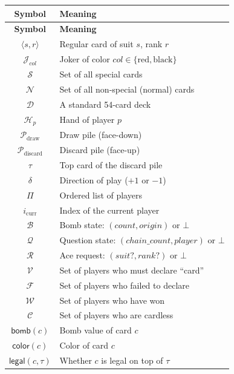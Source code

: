 \documentclass[11pt,a4paper,twoside]{article}
\theoremstyle{definition}
\theoremstyle{remark}
\newcommand{\Card}[2]{\ensuremath{\langle #1, #2 \rangle}}
\newcommand{\Joker}[1]{\ensuremath{\mathcal{J}_{#1}}}
\newcommand{\Deck}{\ensuremath{\mathcal{D}}}
\newcommand{\Hand}{\ensuremath{\mathcal{H}}}
\newcommand{\Pile}{\ensuremath{\mathcal{P}}}
\newcommand{\Top}{\ensuremath{\tau}}
\newcommand{\Dir}{\ensuremath{\delta}}
\newcommand{\Players}{\ensuremath{\Pi}}
\newcommand{\Winner}{\ensuremath{\mathcal{W}}}
\newcommand{\Cardless}{\ensuremath{\mathcal{C}}}
\newcommand{\Bomb}{\ensuremath{\mathcal{B}}}
\newcommand{\Quest}{\ensuremath{\mathcal{Q}}}
\newcommand{\OnVerge}{\ensuremath{\mathcal{V}}}
\newcommand{\Failed}{\ensuremath{\mathcal{F}}}
\newcommand{\CardReq}{\ensuremath{\mathcal{R}}}
\newcommand{\Special}{\ensuremath{\mathcal{S}}}
\newcommand{\Normal}{\ensuremath{\mathcal{N}}}
\newcommand{\func}[1]{\ensuremath{\mathsf{#1}}}
\begin{document}
\begin{longtable}{c|l}
\toprule
\textbf{Symbol} & \textbf{Meaning} \\
\midrule
\endfirsthead
\midrule
\textbf{Symbol} & \textbf{Meaning} \\
\midrule
\endhead
$\Card{s}{r}$     & Regular card of suit $s$, rank $r$ \\
$\Joker{col}$     & Joker of color $col \in \{\text{red}, \text{black}\}$ \\
$\Special$        & Set of all special cards \\
$\Normal$         & Set of all non-special (normal) cards \\
$\Deck$           & A standard 54-card deck \\
$\Hand_p$         & Hand of player $p$ \\
$\Pile_{\text{draw}}$    & Draw pile (face-down) \\
$\Pile_{\text{discard}}$ & Discard pile (face-up) \\
$\Top$            & Top card of the discard pile \\
$\Dir$            & Direction of play ($+1$ or $-1$) \\
$\Players$        & Ordered list of players \\
$i_{\text{curr}}$ & Index of the current player \\
$\Bomb$           & Bomb state: $(count, origin)$ or $\bot$ \\
$\Quest$          & Question state: $(chain\_count, player)$ or $\bot$ \\
$\CardReq$        & Ace request: $(suit?, rank?)$ or $\bot$ \\
$\OnVerge$        & Set of players who must declare ``card'' \\
$\Failed$         & Set of players who failed to declare \\
$\Winner$         & Set of players who have won \\
$\Cardless$       & Set of players who are cardless \\
$\func{bomb}(c)$  & Bomb value of card $c$ \\
$\func{color}(c)$ & Color of card $c$ \\
$\func{legal}(c, \Top)$ & Whether $c$ is legal on top of $\Top$ \\
\bottomrule
\end{longtable}
\end{document}
